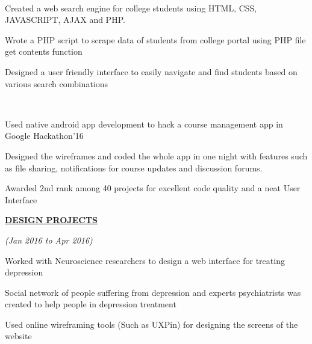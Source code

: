 \documentclass[a4paper]{deedy-resume} %
\begin{document}
\hfill \\

\begin{tightitemize}
\item Created a web search engine for college students using HTML, CSS, JAVASCRIPT, AJAX and PHP.
\item Wrote a PHP script to scrape data of students from college portal using PHP file get contents function
\item Designed a user friendly interface to easily navigate and find students based on various search combinations
\end{tightitemize}

\microspace %

\hfill \\

\begin{tightitemize}
\item Used native android app development to hack a course management app in Google Hackathon’16
\item Designed the wireframes and coded the whole app in one night with features such as file sharing, notifications for course updates and discussion forums.
\item Awarded 2nd rank among 40 projects for excellent code quality and a neat User Interface
\end{tightitemize}

\sectionspace


{\uppercase\uline{\textbf{\large{DESIGN PROJECTS}}\hfill}}

\microspace

\rundescript{}
\hfill {\textit{\small(Jan 2016 to Apr 2016)}}\\
	
\begin{tightitemize}
\item  Worked with Neuroscience researchers to design a web interface for treating depression
\item  Social network of people suffering from depression and experts psychiatrists was created to help people in depression treatment
\item  Used online wireframing tools (Such as UXPin) for designing the screens of the website
\microspace

\end{tightitemize}
\end{document}
